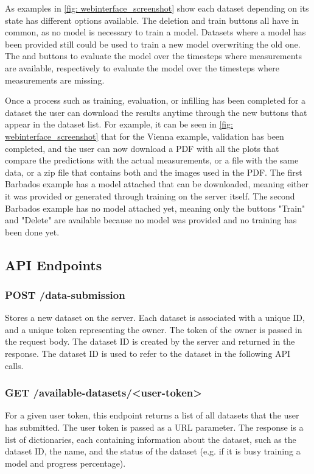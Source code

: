 As examples in \autoref{fig: webinterface_screenshot} show each dataset depending on its state has different options available.
The deletion and train buttons all have in common, as no model is necessary to train a model.
Datasets where a model has been provided still could be used to train a new model overwriting the old one.
The  and  buttons to evaluate the model over the timesteps where measurements are available, respectively to evaluate the model over the timesteps where measurements are missing.

Once a process such as training, evaluation, or infilling has been completed for a dataset the user can download the results anytime through the new buttons that appear in the dataset list.
For example, it can be seen in \autoref{fig: webinterface_screenshot} that for the Vienna example, validation has been completed, and the user can now download a PDF with all the plots that compare the predictions with the actual measurements, or a  file with the same data, or a zip file that contains both and the images used in the PDF.
The first Barbados example has a model attached that can be downloaded, meaning either it was provided or generated through training on the server itself.
The second Barbados example has no model attached yet, meaning only the buttons "Train" and "Delete" are available because no model was provided and no training has been done yet.

\subsection{API Endpoints}
\label{sec: api}

\subsubsection*{POST /data-submission}

Stores a new dataset on the server.
Each dataset is associated with a unique ID, and a unique token representing the owner.
The token of the owner is passed in the request body.
The dataset ID is created by the server and returned in the response.
The dataset ID is used to refer to the dataset in the following API calls.

\subsubsection*{GET /available-datasets/<user-token>}

For a given user token, this endpoint returns a list of all datasets that the user has submitted.
The user token is passed as a URL parameter.
The response is a list of dictionaries, each containing information about the dataset, such as the dataset ID, the name, and the status of the dataset (e.g. if it is busy training a model and progress percentage).

